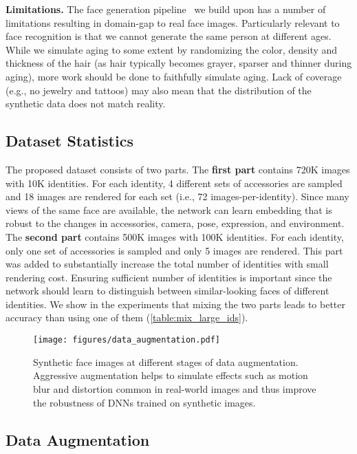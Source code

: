 \documentclass[10pt,twocolumn,letterpaper]{article}
\begin{document}
\noindent
\textbf{Limitations.}
The face generation pipeline~\cite{2021_FakeItMakeIt} we build upon has a number of limitations resulting in domain-gap to real face images. Particularly relevant to face recognition is that we cannot generate the same person at different ages. 
While we simulate aging to some extent by randomizing the color, density and thickness of the hair (as hair typically becomes grayer, sparser and thinner during aging), more work should be done to faithfully simulate aging.
Lack of coverage (e.g., no jewelry and tattoos) may also mean that the distribution of the synthetic data does not match reality.


\subsection{Dataset Statistics}
\label{sec:method3}

The proposed dataset consists of two parts. 
The \textbf{first part} contains 720K images with 10K identities. 
For each identity, 4 different sets of accessories are sampled and 18 images are rendered for each set (i.e., 72 images-per-identity). 
Since many views of the same face are available, the network can learn embedding that is robust to the changes in accessories, camera, pose, expression, and environment. 
The \textbf{second part} contains 500K images with 100K identities. 
For each identity, only one set of accessories is sampled and only 5 images are rendered. 
This part was added to substantially increase the total number of identities with small rendering cost.
Ensuring sufficient number of identities is important since the network should learn to distinguish between similar-looking faces of different identities. 
We show in the experiments that mixing the two parts leads to better accuracy than using one of them (\autoref{table:mix_large_ids}).



\begin{figure}[t]
\begin{center}
\texttt{[image: figures/data\_augmentation.pdf]}
\end{center}
\caption{Synthetic face images at different stages of data augmentation. Aggressive augmentation helps to simulate effects such as motion blur and distortion common in real-world images and thus improve the robustness of DNNs trained on synthetic images.}
\label{fig:augmentation}
\end{figure}


\subsection{Data Augmentation}
\label{sec:method4}
\end{document}

